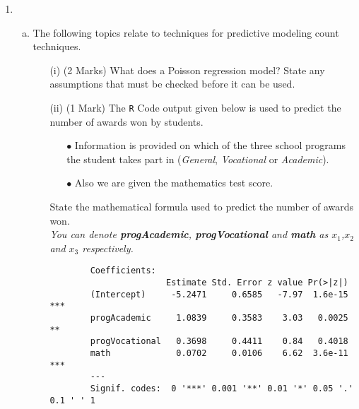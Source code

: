 \begin{enumerate}
\begin{enumerate}[(a)]
\begin{enumerate}[(i)]
	
\end{enumerate}


	
	\end{enumerate}

\item 
\begin{enumerate}[(a)]

\item The following topics relate to techniques for predictive modeling count techniques.


\begin{itemize}
	\item[(i)] (2 Marks)
	What does a Poisson regression model? State any assumptions that must be checked before it can be used.
	
	\item[(ii)] (1 Mark) The \texttt{R} Code output given below is used to predict the number of awards won by students. \begin{itemize} 
		\item[$\bullet$] Information is provided on which of the three school programs the student takes part in (\textit{General}, \textit{Vocational} or \textit{Academic}). 
		\item[$\bullet$] Also we are given the mathematics test score.
	\end{itemize}
	State the mathematical formula used to predict the number of awards won.\\
	\textit{You can denote \textbf{progAcademic}, \textbf{progVocational} and \textbf{math} as $x_1$,$x_2$ and $x_3$ respectively.}
	
	
	\begin{framed}
		\begin{verbatim}
		Coefficients:
		               Estimate Std. Error z value Pr(>|z|)    
		(Intercept)     -5.2471     0.6585   -7.97  1.6e-15 ***
		progAcademic     1.0839     0.3583    3.03   0.0025 ** 
		progVocational   0.3698     0.4411    0.84   0.4018    
		math             0.0702     0.0106    6.62  3.6e-11 ***
		---
		Signif. codes:  0 '***' 0.001 '**' 0.01 '*' 0.05 '.' 0.1 ' ' 1
		
		\end{verbatim}
	\end{framed}



\end{itemize}
\end{enumerate}
\end{enumerate}
